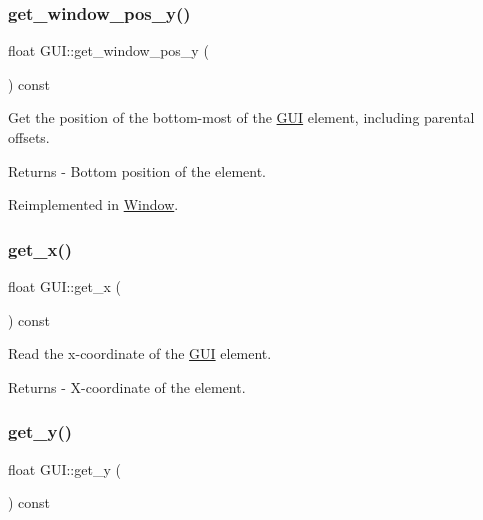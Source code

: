 \mbox{\label{class_g_u_i_a34753a0119188e4b17b4b5209c795c3a}} 
\subsubsection{\texorpdfstring{get\+\_\+window\+\_\+pos\+\_\+y()}{get\_window\_pos\_y()}}
{\footnotesize\ttfamily float G\+U\+I\+::get\+\_\+window\+\_\+pos\+\_\+y (\begin{DoxyParamCaption}{ }\end{DoxyParamCaption}) const\hspace{0.3cm}{\ttfamily [virtual]}}

Get the position of the bottom-\/most of the \mbox{\hyperlink{class_g_u_i}{G\+UI}} element, including parental offsets. \begin{DoxyReturn}{Returns}
-\/ Bottom position of the element. 
\end{DoxyReturn}


Reimplemented in \mbox{\hyperlink{class_window_a950ef0cfbccf484315041162942c4ecc}{Window}}.

\mbox{\label{class_g_u_i_a933b6bc6c5288f785d50e2621ead2193}} 
\subsubsection{\texorpdfstring{get\+\_\+x()}{get\_x()}}
{\footnotesize\ttfamily float G\+U\+I\+::get\+\_\+x (\begin{DoxyParamCaption}{ }\end{DoxyParamCaption}) const}

Read the x-\/coordinate of the \mbox{\hyperlink{class_g_u_i}{G\+UI}} element. \begin{DoxyReturn}{Returns}
-\/ X-\/coordinate of the element. 
\end{DoxyReturn}
\mbox{\label{class_g_u_i_a6a33d5bbe2d6b57b7fd2d9dc141cc3ae}} 
\subsubsection{\texorpdfstring{get\+\_\+y()}{get\_y()}}
{\footnotesize\ttfamily float G\+U\+I\+::get\+\_\+y (\begin{DoxyParamCaption}{ }\end{DoxyParamCaption}) const}


